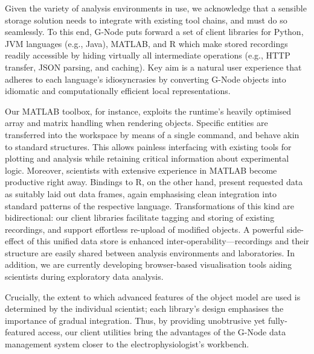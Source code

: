 \documentclass[a4paper]{article}
\begin{document}
Given the variety of analysis environments in use, we acknowledge that a sensible storage solution needs to integrate with existing tool chains, and must do so seamlessly. To this end, G-Node puts forward a set of client libraries for Python, JVM languages (e.g., Java), MATLAB, and R which make stored recordings readily accessible by hiding virtually all intermediate operations (e.g., HTTP transfer, JSON parsing, and caching). Key aim is a natural user experience that adheres to each language's idiosyncrasies by converting G-Node objects into idiomatic and computationally efficient local representations.

Our MATLAB toolbox, for instance, exploits the runtime's heavily optimised array and matrix handling when rendering objects. Specific entities are transferred into the workspace by means of a single command, and behave akin to standard structures. This allows painless interfacing with existing tools for plotting and analysis while retaining critical information about experimental logic. Moreover, scientists with extensive experience in MATLAB become productive right away. Bindings to R, on the other hand, present requested data as suitably laid out data frames, again emphasising clean integration into standard patterns of the respective language. Transformations of this kind are bidirectional: our client libraries facilitate tagging and storing of existing recordings, and support effortless re-upload of modified objects. A powerful side-effect of this unified data store is enhanced inter-operability---recordings and their structure are easily shared between analysis environments and laboratories. In addition, we are currently developing browser-based visualisation tools aiding scientists during exploratory data analysis.

Crucially, the extent to which advanced features of the object model are used is determined by the individual scientist; each library's design emphasises the importance of gradual integration. Thus, by providing unobtrusive yet fully-featured access, our client utilities bring the advantages of the G-Node data management system closer to the electrophysiologist's workbench.
\end{document}
